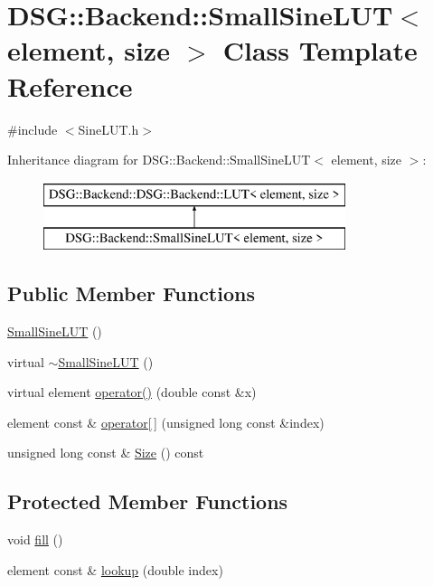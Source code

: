 \hypertarget{classDSG_1_1Backend_1_1SmallSineLUT}{\section{D\+S\+G\+:\+:Backend\+:\+:Small\+Sine\+L\+U\+T$<$ element, size $>$ Class Template Reference}
\label{classDSG_1_1Backend_1_1SmallSineLUT}
}


{\ttfamily \#include $<$Sine\+L\+U\+T.\+h$>$}

Inheritance diagram for D\+S\+G\+:\+:Backend\+:\+:Small\+Sine\+L\+U\+T$<$ element, size $>$\+:\begin{figure}[H]
\begin{center}
\leavevmode
\includegraphics[height=2.000000cm]{classDSG_1_1Backend_1_1SmallSineLUT}
\end{center}
\end{figure}
\subsection*{Public Member Functions}
\begin{DoxyCompactItemize}
\item 
\hyperlink{classDSG_1_1Backend_1_1SmallSineLUT_a2c6aac15943d6373b108336efd29cc03}{Small\+Sine\+L\+U\+T} ()
\item 
virtual \hyperlink{classDSG_1_1Backend_1_1SmallSineLUT_aa94632e333017986bb58b14a5480da52}{$\sim$\+Small\+Sine\+L\+U\+T} ()
\item 
virtual element \hyperlink{classDSG_1_1Backend_1_1SmallSineLUT_af4b947cb0760ade07b788dae2472f4c0}{operator()} (double const \&x)
\item 
element const \& \hyperlink{classDSG_1_1Backend_1_1DSG_1_1Backend_1_1LUT_acd6db2fa4eba392de1cbb4795f351f8a}{operator\mbox{[}$\,$\mbox{]}} (unsigned long const \&index)
\item 
unsigned long const \& \hyperlink{classDSG_1_1Backend_1_1DSG_1_1Backend_1_1LUT_a65daa6f46f978a64da1c86089847602d}{Size} () const 
\end{DoxyCompactItemize}
\subsection*{Protected Member Functions}
\begin{DoxyCompactItemize}
\item 
void \hyperlink{classDSG_1_1Backend_1_1SmallSineLUT_a97ffb8a84efa321e6f2733e17205113a}{fill} ()
\item 
element const \& \hyperlink{classDSG_1_1Backend_1_1SmallSineLUT_a1af95a7037c3abacf58700975deecb3a}{lookup} (double index)
\end{DoxyCompactItemize}
